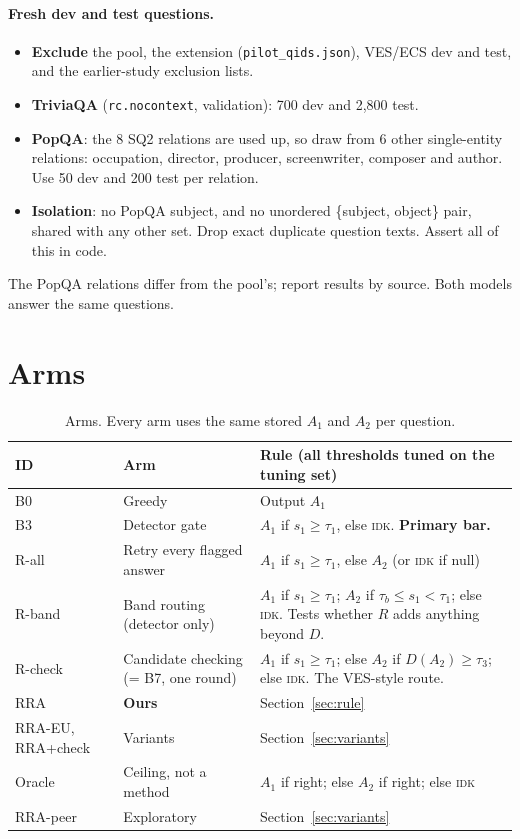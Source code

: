 \documentclass[11pt]{article}
\newcommand{\IDK}{\textsc{idk}}
\begin{document}
\paragraph{Fresh dev and test questions.}
\begin{itemize}
  \item \textbf{Exclude} the pool, the extension (\texttt{pilot\_qids.json}), VES/ECS dev and test, and the
        earlier-study exclusion lists.
  \item \textbf{TriviaQA} (\texttt{rc.nocontext}, validation): 700 dev and 2,800 test.
  \item \textbf{PopQA}: the 8 SQ2 relations are used up, so draw from 6 other single-entity relations:
        occupation, director, producer, screenwriter, composer and author. Use 50 dev and 200 test per relation.
  \item \textbf{Isolation}: no PopQA subject, and no unordered \{subject, object\} pair, shared with any other
        set. Drop exact duplicate question texts. Assert all of this in code.
\end{itemize}
The PopQA relations differ from the pool's; report results by source. Both models answer the same questions.

\section{Arms}

\begin{table}[H]
\centering
\small
\begin{tabularx}{\textwidth}{@{}llL@{}}
\toprule
ID & Arm & Rule (all thresholds tuned on the tuning set) \\
\midrule
B0 & Greedy & Output $A_1$ \\
B3 & Detector gate & $A_1$ if $s_1 \ge \tau_1$, else \IDK. \textbf{Primary bar.} \\
R-all & Retry every flagged answer & $A_1$ if $s_1 \ge \tau_1$, else $A_2$ (or \IDK{} if null) \\
R-band & Band routing (detector only) & $A_1$ if $s_1 \ge \tau_1$; $A_2$ if $\tau_b \le s_1 < \tau_1$; else \IDK.
  Tests whether $R$ adds anything beyond $D$. \\
R-check & Candidate checking (= B7, one round) & $A_1$ if $s_1 \ge \tau_1$; else $A_2$ if $D(A_2) \ge \tau_3$;
  else \IDK. The VES-style route. \\
RRA & \textbf{Ours} & Section~\ref{sec:rule} \\
RRA-EU, RRA+check & Variants & Section~\ref{sec:variants} \\
Oracle & Ceiling, not a method & $A_1$ if right; else $A_2$ if right; else \IDK \\
RRA-peer & Exploratory & Section~\ref{sec:variants} \\
\bottomrule
\end{tabularx}
\caption{Arms. Every arm uses the same stored $A_1$ and $A_2$ per question.}
\end{table}
\end{document}
